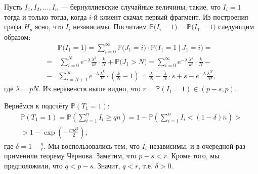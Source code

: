 \documentclass{matmex-diploma-custom}
\newcommand{\PRob}{\mathbb P}
\newcommand{\geqs}{\geqslant}
\theoremstyle{named}
\begin{document}
Пусть $I_1, I_2, \dots, I_n$ --- бернуллиевские случайные величины, такие, что $I_i = 1$ тогда и только тогда, 
когда $i$-й клиент скачал первый фрагмент. Из построения графа $H_p$ ясно, что $I_i$ независимы.
Посчитаем $\PRob\big(I_i = 1\big) = \PRob\big(I_1 = 1\big)$ следующим образом:
\begin{equation}\begin{aligned}
&\PRob\big(I_1 = 1\big) = \sum_{i = 0}^\infty \PRob\big(J_1 = i\big) \cdot \PRob\Big(I_1 = 1 ~\big|~ J_1 = i\Big) 
	= 
\\
	= 
&~\sum_{i = 0}^N e^{-\lambda} \frac{\lambda^k}{k!} \cdot \frac {k}{N} + \PRob\big(J_1 > N\big)
	=
\sum_{i = 0}^{\infty} e^{-\lambda} \frac{\lambda^k}{k!} \cdot \frac {k}{N}  
	- 
	\\
	-
&\sum_{i = N + 1}^{\infty} e^{-\lambda} \frac{\lambda^k}{k!} \cdot \left(\frac {k}{N} - 1\right)
	=
\frac{\lambda}{N} - \frac{\lambda}{N} \cdot s + s - e^{-\lambda} \frac{\lambda^N}{N!},
\end{aligned}\end{equation}
где $\lambda = pN$. Из неравенств выше видно, что $r = \PRob(I_1 = 1) \in (p - s, p)$.

Вернёмся к подсчёту $\PRob(T_1 = 1)$:
\begin{equation}\begin{aligned}
\PRob(T_1 = 1) = \PRob\left(\sum_{i=1}^n I_i \geqs qn\right) 
	= 
1 - \PRob\left(\sum_{i=1}^n I_i < (1-\delta)n\right)
	>
\\
	>
1 - \exp \left( - \frac{rn \delta^2}{2} \right),
\end{aligned}\end{equation}
где $\delta = 1 - \frac{q}{r}$. Мы воспользовались тем, что $I_i$ независимы, и в очередной раз применили теорему Чернова. 
Заметим, что $p - s < r$. Кроме того, мы предположили, что $q < p-s$. Значит, $q < r$, т.е. $\delta > 0$.
\end{document}
